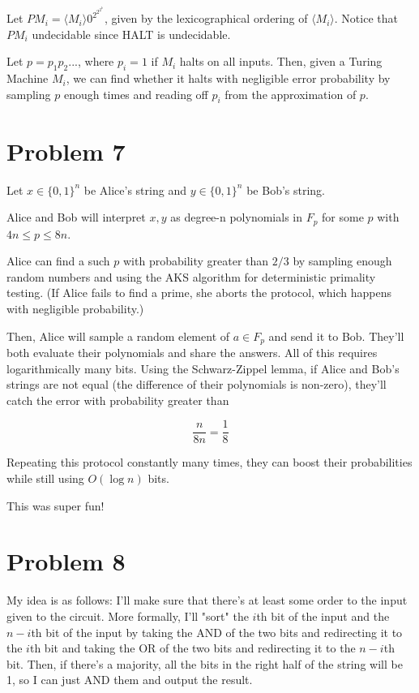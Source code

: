 \documentclass[usletter]{article}
\begin{document}
Let $PM_{i} = \langle M_{i} \rangle0^{2^{2^{2^{k}}}}$, given by the lexicographical ordering
of $\langle M_{i} \rangle$. Notice that $PM_{i}$ undecidable since HALT is undecidable. 

Let $p = p_{1}p_{2}...$, where
$p_{i} = 1$ if $M_{i}$ halts on all inputs. Then, given a Turing Machine $M_{i}$,
we can find whether it halts with negligible error probability by sampling $p$
enough times and reading off $p_{i}$ from the approximation of $p$.


\newpage

\section*{Problem 7}

Let $x \in \{0,1\}^{n}$ be Alice's string and 
$y \in \{0,1\}^{n}$ be Bob's string.

Alice and Bob will interpret $x,y$
as degree-n polynomials in $F_{p}$ for some 
$p$ with $4n \leq p \leq 8n$. 

Alice can find a such $p$
with probability greater than $2/3$ by sampling enough 
random numbers and using the AKS algorithm for deterministic
primality testing. (If Alice fails to find a prime, she aborts the
protocol, which happens with negligible probability.) 

Then, Alice will sample a random element of $a \in F_{p}$ and send it to Bob.
They'll both evaluate their polynomials and share the answers. All of this
requires logarithmically many bits. Using the Schwarz-Zippel lemma, if 
Alice and Bob's strings are not equal (the difference of their polynomials
is non-zero), they'll catch the error with probability greater than

\[ \frac{n}{8n} = \frac{1}{8}\]

Repeating this protocol constantly many times, they can boost their
probabilities while still using $O(\log n)$ bits.

This was super fun!

\newpage

\section*{Problem 8}

My idea is as follows: I'll make sure that there's at least some order
to the input given to the circuit. More formally, I'll "sort" the $i$th
bit of the input and the $n-i$th bit of the input by taking the AND
of the two bits and redirecting it to the $i$th bit and taking the OR of
the two bits and redirecting it to the $n-i$th bit. Then, if there's a majority,
all the bits in the right half of the string will be 1, so I can just AND them
and output the result.
\end{document}
